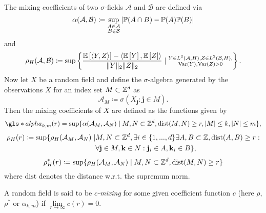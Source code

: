 \begin{defn} \label{defn:mixing coefficients}
    The mixing coefficients of two $\sigma$-fields $\mathcal{A}$ and $\mathcal{B}$ are defined via
    \begin{equation}
        \alpha(\mathcal{A}, \mathcal{B}) \coloneqq \sup\limits_{\substack{A \in \mathcal{A} \\ B \in \mathcal{B}}} | \mathbb{P}(A \cap B) - \mathbb{P}(A) \mathbb{P}(B)|
    \end{equation}
    and
    \begin{equation}
        \rho_H(\mathcal{A}, \mathcal{B}) \coloneqq \sup\left\{ \frac{\mathbb{E}\left[\langle Y, Z \rangle\right] - \langle \mathbb{E}\left[Y\right], \mathbb{E}\left[Z\right] \rangle}{\|Y\|_2 \|Z\|_2} \mid \substack{Y \in L^2(\mathcal{A}, H), Z \in L^2(\mathcal{B}, H), \\ \mathrm{Var}(Y), \mathrm{Var}(Z) > 0 } \right\}.
    \end{equation}
    Now let $X$ be a random field and define the $\sigma$-algebra generated by the observations $X$ for an index set $M \subset \mathbb{Z}^d$ as
    \[ \mathcal{A}_M \coloneqq \sigma(X_{\mathbf{j}}: \mathbf{j} \in M). \]
    Then the mixing coefficients of $X$ are defined as the functions given by
    \begin{equation}
        \gls*{alpha}_{k, m}(r) = \sup\{ \alpha(\mathcal{A}_M, \mathcal{A}_N) \mid M, N \subset \ZZ^d, \mathrm{dist}(M, N) \geq r, |M| \leq k, |N| \leq m \},
    \end{equation}
    \begin{equation} \label{defn:rho_mixing coefficient} \begin{split}
        \rho_H(r) \coloneqq \sup\{ \rho_H(\mathcal{A}_M, \mathcal{A}_N) \mid & M, N \subset \mathbb{Z}^d, \exists i \in \{1, ..., d\} \exists A, B \subset \mathbb{Z}, \mathrm{dist}(A, B) \geq r: \\ 
        & \forall \mathbf{j} \in M, \mathbf{k} \in N: \mathbf{j}_i \in A, \mathbf{k}_i \in B \},
    \end{split} \end{equation}
    \begin{equation} \label{defn:rho_star_mixing coefficient}
        \rho^*_H(r) \coloneqq \sup\{ \rho_H(\mathcal{A}_M, \mathcal{A}_N) \mid M, N \subset \mathbb{Z}^d, \mathrm{dist}(M, N) \geq r \} 
    \end{equation}
    where $\mathrm{dist}$ denotes the distance w.r.t. the supremum norm.

    A random field is said to be \textit{$c$-mixing} for some given coefficient function $c$ (here $\rho$, $\rho^*$ or $\alpha_{k,m}$) if $\lim\limits_{r \to \infty} c(r) = 0$.
\end{defn}


